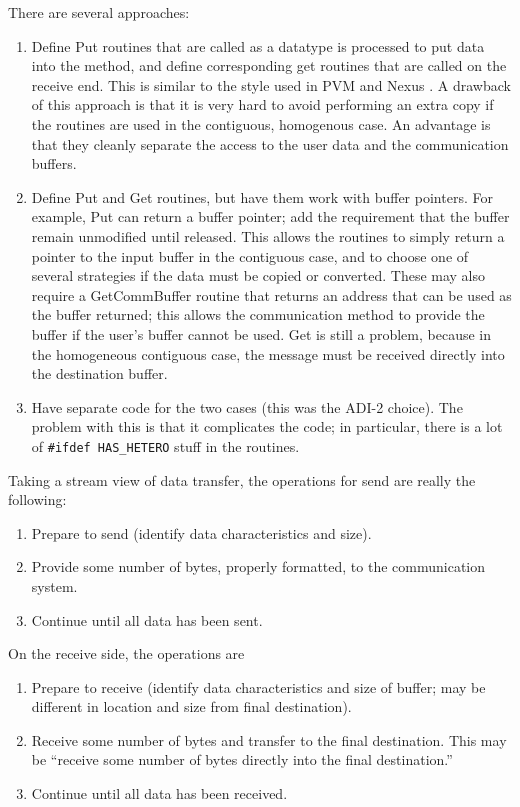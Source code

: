 \documentclass{article}
\let\code=\texttt
\begin{document}
There are several approaches:
\begin{enumerate}
\item Define Put routines that are called as a datatype is processed to put
  data into the method, and define corresponding get routines that are called
  on the receive end.  This is similar to the style used in PVM
  \cite{pvm-book} and Nexus \cite{nexus-manual}.  A drawback of this approach
  is that it is very hard to avoid performing an extra copy if the routines
  are used in the contiguous, homogenous case.  An advantage is that they
  cleanly separate the access to the user data and the communication buffers.

\item Define Put and Get routines, but have them work with buffer pointers.
  For example, Put can return a buffer pointer; add
  the requirement that the buffer remain unmodified until released.
  This allows the routines to simply return a pointer to the input buffer in
  the contiguous case, and to choose one of several strategies if the data
  must be copied or converted.  These may also require a GetCommBuffer routine
  that returns an address that can be used as the buffer returned; this allows
  the communication method to provide the buffer if the user's buffer cannot
  be used.  Get is still a problem, because in the homogeneous contiguous
  case,  the message must be received directly into the destination buffer.

\item Have separate code for the two cases (this was the ADI-2 choice).  The
  problem with this is that it complicates the code; in particular, there is a
  lot of \code{\#ifdef HAS\_HETERO} stuff in the routines.
\end{enumerate}

Taking a stream view of data transfer, the operations for send are really the
following:
\begin{enumerate}
\item Prepare to send (identify data characteristics and size).
\item Provide some number of bytes, properly formatted, to the communication
  system.
\item Continue until all data has been sent.
\end{enumerate}
On the receive side, the operations are
\begin{enumerate}
\item Prepare to receive (identify data characteristics and size of buffer;
  may be different in location and size from final destination).
\item Receive some number of bytes and transfer to the final destination.
  This may be ``receive some number of bytes directly into the final
  destination.'' 
\item Continue until all data has been received.
\end{enumerate}
\end{document}
